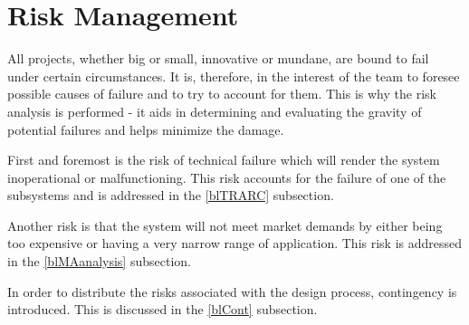\chapter{Risk Management}
All projects, whether big or small, innovative or mundane, are bound to fail under certain circumstances. It is, therefore, in the interest of the team to foresee possible causes of failure and to try to account for them. This is why the risk analysis is performed - it aids in determining and evaluating the gravity of potential failures and helps minimize the damage. 

First and foremost is the risk of technical failure which will render the system inoperational or malfunctioning. This risk accounts for the failure of one of the subsystems and is addressed in the \ref{blTRARC} subsection.

Another risk is that the system will not meet market demands by either being too expensive or having a very narrow range of application. This risk is addressed in the \ref{blMAanalysis} subsection. 

In order to distribute the risks associated with the design process, contingency is introduced. This is discussed in the \ref{blCont} subsection.
